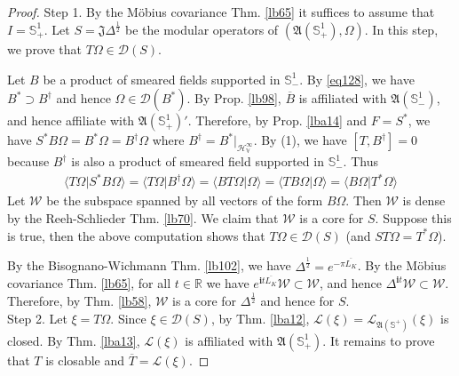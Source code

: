 \documentclass[12pt,b5paper,notitlepage]{article}
\theoremstyle{definition}
\theoremstyle{plain}
\newcommand{\fk}{\mathfrak}
\newcommand{\mc}{\mathcal}
\newcommand{\ovl}{\overline}
\newcommand{\Dom}{\scr{D}}
\newcommand{\bk}[1]{\langle {#1}\rangle}
\newcommand{\scr}{\mathscr}
\newcommand{\im}{\mathbf{i}}
\newcommand{\Rbb}{\mathbb R}
\newcommand{\Sbb}{{\mathbb S}}
\newcommand{\HV}{\mathcal H_{\mathbb V}}
\numberwithin{equation}{section}
\begin{document}
\begin{proof}
Step 1. By the M\"obius covariance Thm. \ref{lb65} it suffices to assume that $I=\Sbb^1_+$. Let $S=\fk J\Delta^{\frac 12}$ be the modular operators of $(\fk A(\Sbb^1_+),\Omega)$. In this step, we prove that $T\Omega\in\Dom(S)$. 

Let $B$ be a product of smeared fields supported in $\Sbb^1_-$. By \eqref{eq128}, we have $B^*\supset B^\dagger$ and hence $\Omega\in\Dom(B^*)$. By Prop. \ref{lb98}, $\ovl B$ is affiliated with $\fk A(\Sbb^1_-)$, and hence affiliate with $\fk A(\Sbb^1_+)'$. Therefore, by Prop. \ref{lba14} and $F=S^*$, we have $S^*B\Omega=B^*\Omega=B^\dagger\Omega$ where $B^\dagger=B^*|_{\HV^\infty}$. By (1), we have $[T,B^\dagger]=0$ because $B^\dagger$ is also a product of smeared field supported in $\Sbb^1_-$. Thus
\begin{align*}
\bk{T\Omega|S^*B\Omega}=\bk{T\Omega|B^\dagger\Omega}=\bk{BT\Omega|\Omega}=\bk{TB\Omega|\Omega}=\bk{B\Omega|T^*\Omega}
\end{align*}
Let $\mc W$ be the subspace spanned by all vectors of the form $B\Omega$. Then $\mc W$ is dense by the Reeh-Schlieder Thm. \ref{lb70}. We claim that $\mc W$ is a core for $S$. Suppose this is true, then the above computation shows that $T\Omega\in\Dom(S)$ (and $ST\Omega=T^*\Omega$).


By the Bisognano-Wichmann Thm. \ref{lb102}, we have $\Delta^{\frac 12}=e^{-\pi\ovl{L_K}}$. By the M\"obius covariance Thm. \ref{lb65}, for all $t\in\Rbb$ we have $e^{\im t\ovl{L_K}}\mc W\subset\mc W$, and hence $\Delta^{\im t}\mc W\subset\mc W$. Therefore, by Thm. \ref{lb58}, $\mc W$ is a core for $\Delta^{\frac 12}$ and hence for $S$.\\[-1ex]

Step 2. Let $\xi=T\Omega$. Since $\xi\in\Dom(S)$, by Thm. \ref{lba12}, $\scr L(\xi)=\scr L_{\fk A(\Sbb^+)}(\xi)$ is closed. By Thm. \ref{lba13}, $\scr L(\xi)$ is affiliated with $\fk A(\Sbb^1_+)$. It remains to prove that $T$ is closable and $\ovl T=\scr L(\xi)$.


\end{proof}
\end{document}
